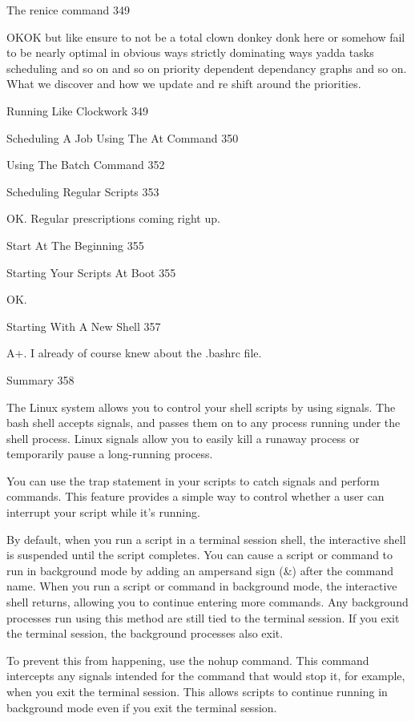The renice command 349

OKOK but like ensure to not be a total clown donkey donk here or somehow fail to be nearly optimal in obvious ways strictly dominating ways yadda tasks scheduling and so on and so on priority dependent dependancy graphs and so on. What we discover and how we update and re shift around the priorities.

Running Like Clockwork 349



Scheduling A Job Using The At Command 350



Using The Batch Command 352



Scheduling Regular Scripts 353

OK. Regular prescriptions coming right up.

Start At The Beginning 355



Starting Your Scripts At Boot 355

OK.

Starting With A New Shell 357

A+. I already of course knew about the .bashrc file.

Summary 358

The Linux system allows you to control your shell scripts by using signals. The bash shell accepts signals, and passes them on to any process running under the shell process. Linux signals allow you to easily kill a runaway process or temporarily pause a long-running process.

You can use the trap statement in your scripts to catch signals and perform commands. This feature provides a simple way to control whether a user can interrupt your script while it's running.

By default, when you run a script in a terminal session shell, the interactive shell is suspended until the script completes. You can cause a script or command to run in background mode by adding an ampersand sign (&) after the command name. When you run a script or command in background mode, the interactive shell returns, allowing you to continue entering more commands. Any background processes run using this method are still tied to the terminal session. If you exit the terminal session, the background processes also exit.

To prevent this from happening, use the nohup command. This command intercepts any signals intended for the command that would stop it, for example, when you exit the terminal session. This allows scripts to continue running in background mode even if you exit the terminal session.

